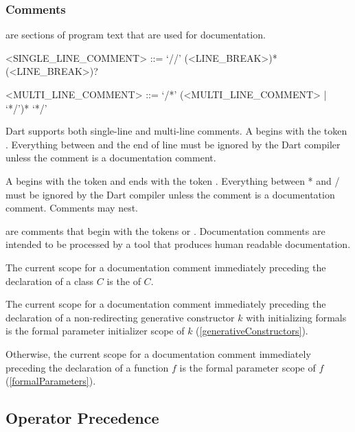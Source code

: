 \documentclass[makeidx]{article}
\begin{document}
\subsubsection{Comments}

\LMHash{}%
are sections of program text that are used for documentation.

\begin{grammar}
<SINGLE\_LINE\_COMMENT> ::= \gnewline{}
  `//' \gtilde(<LINE\_BREAK>)* (<LINE\_BREAK>)?

<MULTI\_LINE\_COMMENT> ::= \gnewline{}
  `/*' (<MULTI\_LINE\_COMMENT> | \gtilde{} `*/')* `*/'
\end{grammar}

\LMHash{}%
Dart supports both single-line and multi-line comments.
A  begins with the token \code{//}.
Everything between \code{//} and the end of line
must be ignored by the Dart compiler
unless the comment is a documentation comment.

\LMHash{}%
A  begins with the token \code{/*}
and ends with the token \code{*/}.
Everything between \code{/}* and \code{*}/
must be ignored by the Dart compiler
unless the comment is a documentation comment.
Comments may nest.

\LMHash{}%
are comments that begin with the tokens \code{///} or \code{/**}.
Documentation comments are intended to be processed by
a tool that produces human readable documentation.

\LMHash{}%
The current scope for a documentation comment immediately preceding
the declaration of a class $C$ is the
of $C$.

\LMHash{}%
The current scope for a documentation comment immediately preceding
the declaration of a non-redirecting generative constructor $k$
with initializing formals is the formal parameter initializer scope of $k$
(\ref{generativeConstructors}).

\LMHash{}%
Otherwise, the current scope for a documentation comment immediately preceding
the declaration of a function $f$ is the formal parameter scope of $f$
(\ref{formalParameters}).


\subsection{Operator Precedence}
\end{document}
